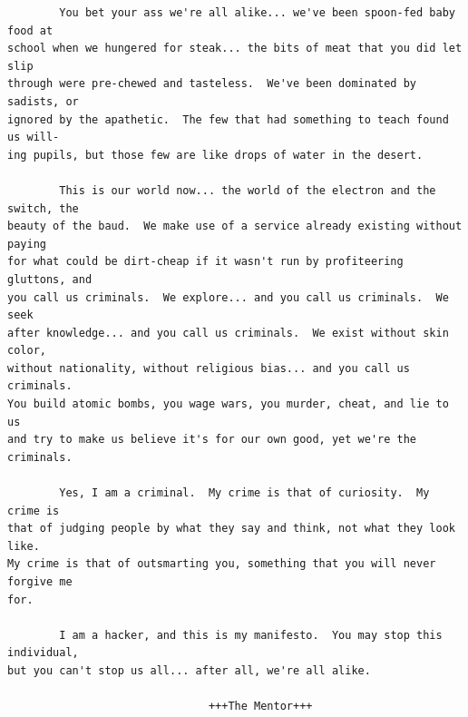 \documentclass [titlepage, 12pt]{article}
\begin{document}
\begin{verbatim}
        You bet your ass we're all alike... we've been spoon-fed baby food at
school when we hungered for steak... the bits of meat that you did let slip
through were pre-chewed and tasteless.  We've been dominated by sadists, or
ignored by the apathetic.  The few that had something to teach found us will-
ing pupils, but those few are like drops of water in the desert.

        This is our world now... the world of the electron and the switch, the
beauty of the baud.  We make use of a service already existing without paying
for what could be dirt-cheap if it wasn't run by profiteering gluttons, and
you call us criminals.  We explore... and you call us criminals.  We seek
after knowledge... and you call us criminals.  We exist without skin color,
without nationality, without religious bias... and you call us criminals.
You build atomic bombs, you wage wars, you murder, cheat, and lie to us
and try to make us believe it's for our own good, yet we're the criminals.

        Yes, I am a criminal.  My crime is that of curiosity.  My crime is
that of judging people by what they say and think, not what they look like.
My crime is that of outsmarting you, something that you will never forgive me
for.

        I am a hacker, and this is my manifesto.  You may stop this individual,
but you can't stop us all... after all, we're all alike.

                               +++The Mentor+++
\end{verbatim}
\end{document}
